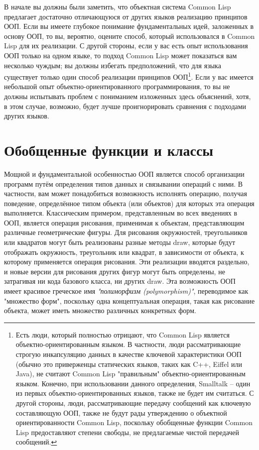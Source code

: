 В начале вы должны были заметить, что объектная система Common Lisp предлагает достаточно
отличающуюся от других языков реализацию принципов ООП. Если вы имеете глубокое понимание
фундаментальных идей, заложенных в основу ООП, то вы, вероятно, оцените способ, который
использовался в Common Lisp для их реализации.  С другой стороны, если у вас есть опыт
использования ООП только на одном языке, то подход Common Lisp может показаться вам
несколько чуждым; вы должны избегать предположений, что для языка существует только один
способ реализации принципов ООП\footnote{Есть люди, который полностью отрицают, что Common
  Lisp является объектно-ориентированным языком.  В частности, люди рассматривающие
  строгую инкапсуляцию данных в качестве ключевой характеристики ООП (обычно это
  приверженцы статических языков, таких как C++, Eiffel или Java), не считают Common Lisp
  "правильным" объектно-ориентированным языком.  Конечно, при использовании данного
  определения, Smalltalk -- один из первых объектно-ориентированных языков, также не будет
  им считаться.  С другой стороны, люди, рассматривающие передачу сообщений как ключевую
  составляющую ООП, также не будут рады утверждению о объектной ориентированности Common
  Lisp, поскольку обобщенные функции Common Lisp предоставляют степени свободы, не
  предлагаемые чистой передачей сообщений.}.  Если у вас имеется небольшой опыт
объектно-ориентированного программирования, то вы не должны испытывать проблем с
пониманием изложенных здесь объяснений, хотя, в этом случае, возможно, будет лучше
проигнорировать сравнения с подходами других языков.

\section{Обобщенные функции и классы}

Мощной и фундаментальной особенностью ООП является способ организации программ путём
определения типов данных и связывании операций с ними.  В частности, вам может
понадобиться возможность исполнять операцию, получая поведение, определённое типом объекта
(или объектов) для которых эта операция выполняется. Классическим примером, представленным
во всех введениях в ООП, является операция рисования, применимая к объектам,
представляющим различные геометрические фигуры.  Для рисования окружностей, треугольников
или квадратов могут быть реализованы разные методы draw, которые будут отображать
окружность, треугольник или квадрат, в зависимости от объекта, к которому применяется
операция рисования. Эти реализации вводятся раздельно, и новые версии для рисования других
фигур могут быть определены, не затрагивая ни кода базового класса, ни других draw.  Эта
возможность ООП имеет красивое греческое имя \textit{"полиморфизм (polymorphism)"},
переводимое как "множество форм", поскольку одна концептуальная операция, такая как
рисование объекта, может иметь множество различных конкретных форм.

